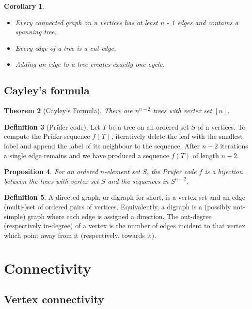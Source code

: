 \documentclass[11pt, fleqn, a4paper, landscape]{article}
\theoremstyle{plain} %
\newtheorem{thm}{Theorem}
\newtheorem{pro}[thm]{Proposition}
\newtheorem{cor}[thm]{Corollary}
\theoremstyle{remark} %
\theoremstyle{definition} %
\newtheorem{defi}[thm]{Definition}
\begin{document}
\begin{multicols}{3}
\begin{cor}
\begin{itemize}
\item  Every connected graph on n vertices has at least n - 1 edges and contains a spanning tree,
\item Every edge of a tree is a cut-edge,
\item Adding an edge to a tree creates exactly one cycle.
\end{itemize}
\end{cor}

\subsection{Cayley’s formula}
\addtocounter{thm}{1}\addtocounter{thm}{1}
\begin{thm}[Cayley’s Formula]
There are $n^{n-2}$ trees with vertex set $[n]$.
\end{thm}

\begin{defi}[Prüfer code]
Let $T$ be a tree on an ordered set $S$ of n vertices. To compute the
Prüfer sequence $f(T)$, iteratively delete the leaf with the smallest label and append the label of its neighbour to the sequence. After $n - 2$ iterations a single edge remains and we have produced a sequence $f(T)$ of length $n - 2$.
\end{defi}
\addtocounter{thm}{1}
\begin{pro}
For an ordered $n$-element set $S$, the Prüfer code $f$ is a bijection between the trees with vertex set $S$ and the sequences in $S^{n-2}$.
\end{pro}
\addtocounter{thm}{1}
\begin{defi}
A directed graph, or digraph for short, is a vertex set and an edge (multi-)set of ordered pairs of vertices. Equivalently, a digraph is a (possibly not-simple) graph where each edge is assigned a direction. The out-degree (respectively in-degree) of a vertex is the number of edges
incident to that vertex which point away from it (respectively, towards it).
\end{defi}

\section{Connectivity}
\subsection{Vertex connectivity}


\end{multicols}
\end{document}
